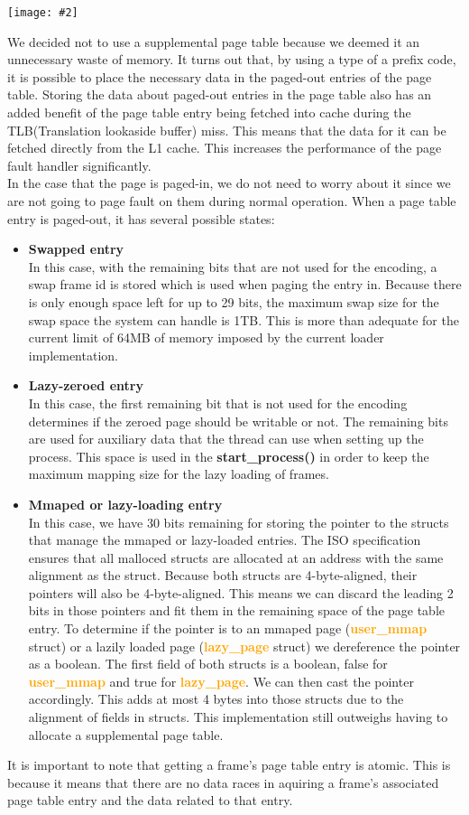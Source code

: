 \documentclass{report}
\newcommand{\bullpara}[2]{\item \textbf{#1} \ #2}
\newcommand{\fun}[1]{\textcolor{Emerald}{\textbf{#1}}}
\newcommand{\struct}[1]{\textcolor{orange}{\textbf{#1}}}
\newcommand{\centerimage}[2]{\begin{center}
	\texttt{[image: \#2]}
\end{center}}
\newcommand{\compitem}[1]{\begin{itemize}\setlength\itemsep{-0.1em}#1\end{itemize}}
\begin{document}
				\centerimage{width=\textwidth}{page table entry.png}
				We decided not to use a supplemental page table because we 
				deemed it an unnecessary waste of memory. It turns out that, by
				using a type of a prefix code, it is possible to place the necessary 
				data in the paged-out entries of the page table. 
				Storing the data about paged-out entries in the page table also has 
				an added benefit of the page table entry being fetched into cache during
				the TLB(Translation lookaside buffer) miss. This means that the data for it can be fetched directly from the L1 cache. 
				This increases the performance of the page fault handler significantly. \\
				In the case that the page is paged-in, we do not 
				need to worry about it since we are not going to page fault on 
				them during normal operation. When a page table entry is paged-out, it has 
				several possible states:
				\compitem{
					\bullpara{Swapped entry}
						{\\In this case, with the remaining bits that are not 
						used for the encoding, a swap frame id is stored which 
						is used when paging the entry in. Because there is only enough space left
						for up to 29 bits, the maximum swap size for the swap space the system can handle is 1TB.
						This is more than adequate for the current limit of 64MB of 
						memory imposed by the current loader implementation.
						}
					\bullpara{Lazy-zeroed entry}
						{\\In this case, the first remaining bit that is not 
						used for the encoding determines if the zeroed page 
						should be writable or not. The remaining bits are used 
						for auxiliary data that the thread can use when setting 
						up the process. This space is used in the \fun{start\_process()} in order
						to keep the maximum mapping size for the lazy loading of
						frames.}
					\bullpara{Mmaped or lazy-loading entry}
						{\\ In this case, we have 30 bits remaining for storing 
						the pointer to the structs that manage the mmaped or 
						lazy-loaded entries. The ISO specification ensures that 
						all malloced structs are allocated at an address with the 
						same alignment as the struct. Because both structs are 
						4-byte-aligned, their pointers will also be 4-byte-aligned. 
						This means we can discard the leading 2 bits 
						in those pointers and fit them in the remaining space 
						of the page table entry. To determine if the pointer is to an mmaped
						page (\struct{user\_mmap} struct) or a lazily loaded
						page (\struct{lazy\_page} struct) we dereference the 
						pointer as a boolean. The first field of both structs 
						is a boolean, false for \struct{user\_mmap} and true for 
						\struct{lazy\_page}. We can then cast the pointer 
						accordingly. This adds at most 4 bytes into those structs due to the 
						alignment of fields in structs. This implementation still outweighs having to allocate a 
						supplemental page table.}
				}
				It is important to note that getting a frame's page table entry is atomic.
				This is because it means that there are no data races in
				aquiring a frame's associated page table entry and the data related to that
				entry.
				
\end{document}
